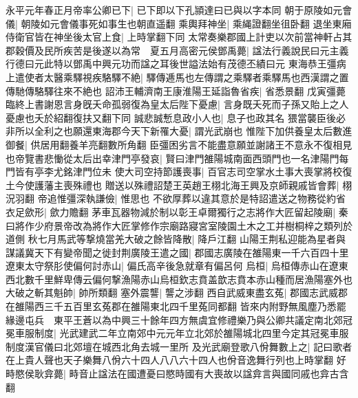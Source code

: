 永平元年春正月帝率公卿已下|{
	已下即以下孔頴達曰已與以字本同}
朝于原陵如元會儀|{
	朝陵如元會儀事死如事生也朝直遥翻}
乘輿拜神坐|{
	乘䋲證翻坐徂卧翻}
退坐東廂侍衛官皆在神坐後太官上食|{
	上時掌翻下同}
太常奏樂郡國上計吏以次前當神軒占其郡穀價及民所疾苦是後遂以為常　夏五月高密元侯鄧禹薨|{
	諡法行義說民曰元主義行德曰元此特以鄧禹中興元功而諡之耳後世謚法始有茂德丕績曰元}
東海恭王彊病上遣使者太醫乘驛視疾駱驛不絶|{
	驛傳逓馬也左傳謂之乘驛者乘驛馬也西漢謂之置傳馳傳駱驛往來不絶也}
詔沛王輔濟南王康淮陽王延詣魯省疾|{
	省悉景翻}
戊寅彊薨臨終上書謝恩言身旣夭命孤弱復為皇太后陛下憂慮|{
	言身既夭死而子孫又貽上之人憂慮也夭於紹翻復扶又翻下同}
誠悲誠慙息政小人也|{
	息子也政其名}
猥當襲臣後必非所以全利之也願還東海郡今天下新罹大憂|{
	謂光武崩也}
惟陛下加供養皇太后數進御餐|{
	供居用翻養羊亮翻數所角翻}
臣彊困劣言不能盡意願並謝諸王不意永不復相見也帝覽書悲慟從太后出幸津門亭發哀|{
	賢曰津門雒陽城南面西頭門也一名津陽門每門皆有亭李尤銘津門位未}
使大司空持節護喪事|{
	百官志司空掌水土事大喪掌將校復土今使護藩主喪殊禮也}
贈送以殊禮詔楚王英趙王栩北海王興及京師親戚皆會葬|{
	栩況羽翻}
帝追惟彊深執謙儉|{
	惟思也}
不欲厚葬以違其意於是特詔遣送之物務從約省衣足歛形|{
	歛力贍翻}
茅車瓦器物減於制以彰王卓爾獨行之志將作大匠留起陵廟|{
	秦曰將作少府景帝改為將作大匠掌修作宗廟路寢宮室陵園土木之工并樹桐梓之類列於道側}
秋七月馬武等撃燒當羌大破之餘皆降散|{
	降戶江翻}
山陽王荆私迎能為星者與謀議冀天下有變帝聞之徙封荆廣陵王遣之國|{
	郡國志廣陵在雒陽東一千六百四十里}
遼東太守祭肜使偏何討赤山|{
	偏氏高辛後急就章有偏呂何}
烏桓|{
	烏桓傳赤山在遼東西北數千里鮮卑傳云偏何撃漁陽赤山烏桓欽志賁盖歆志賁本赤山種而居漁陽塞外也}
大破之斬其魁帥|{
	帥所類翻}
塞外震讋|{
	讋之涉翻}
西自武威東盡玄菟|{
	郡國志武威郡在雒陽西三千五百里玄菟郡在雒陽東北四千里菟同都翻}
皆來内附野無風塵乃悉罷緣邊屯兵　東平王蒼以為中興三十餘年四方無虞宜修禮樂乃與公卿共議定南北郊冠冕車服制度|{
	光武建武二年立南郊中元元年立北郊於雒陽城北四里今定其冠冕車服制度漢官儀曰北郊壇在城西北角去城一里所}
及光武廟登歌八佾舞數上之|{
	記曰歌者在上貴人聲也天子樂舞八佾六十四人八八六十四人也佾音逸舞行列也上時掌翻}
好畤愍侯耿弇薨|{
	畤音止諡法在國遭憂曰愍時國有大喪故以諡弇言與國同戚也弇古含翻}


